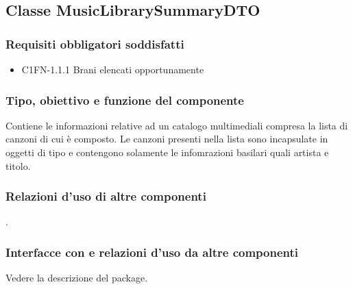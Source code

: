 \subsection{Classe MusicLibrarySummaryDTO}
\subsubsection*{Requisiti obbligatori soddisfatti}
\begin{itemize}
	\item C1FN-1.1.1 Brani elencati opportunamente
\end{itemize}
\subsubsection*{Tipo, obiettivo e funzione del componente}
Contiene le informazioni relative ad un catalogo multimediali compresa la lista
di canzoni di cui \`e composto. Le canzoni presenti nella lista sono incapsulate
in oggetti di tipo  e contengono solamente le infomrazioni
basilari quali artista e titolo. 
\subsubsection*{Relazioni d'uso di altre
componenti} . 
\subsubsection*{Interfacce con e relazioni d'uso da altre componenti}
Vedere la descrizione del package.
